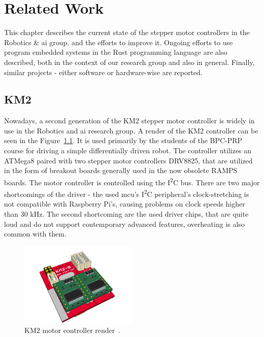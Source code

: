 \chapter{Related Work}
\label{ch:related_work}
This chapter describes the current state of the stepper motor controllers in the Robotics \& \acs{ai} group, and the efforts to improve it.
Ongoing efforts to use program embedded systems in the Rust programming language are also described, both in the context of our research group and also in general.
Finally, similar projects - either software or hardware-wise are reported.

\section{KM2}
\label{sec:km2}
Nowadays, a second generation of the KM2 stepper motor controller is widely in use in the Robotics and \acs{ai} research group.
A render of the KM2 controller can be seen in the Figure~\ref{fig:km2render}.
It is used primarily by the students of the BPC-PRP course for driving a simple differentially driven robot.
The controller utilizes an ATMega8 paired with two stepper motor controllers DRV8825, that are utilized in the form of breakout boards generally used in the now obsolete RAMPS boards.
The motor controller is controlled using the I\textsuperscript{2}C bus.
There are two major shortcomings of the driver - the used \acs{mcu}'s I\textsuperscript{2}C peripheral's clock-stretching is not compatible with Raspberry Pi's, causing problems on clock speeds higher than 30 kHz.
The second shortcoming are the used driver chips, that are quite loud and do not support contemporary advanced features, overheating is also common with them.

\begin{figure}[H]
    \centering
    \includegraphics[width=0.5\textwidth]{obrazky/km2render}
    \caption{KM2 motor controller render~\cite{burian_km2renderpng_nodate}.}
    \label{fig:km2render}
\end{figure}

